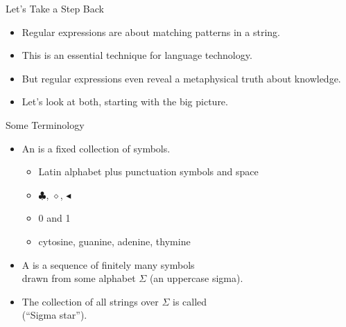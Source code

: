 \documentclass[professionalfonts, xcolor={usenames,svgnames,x11names,table}]{beamer}
\begin{document}
\begin{frame}{Let's Take a Step Back}
    \begin{itemize}
        \item Regular expressions are about matching patterns in a string.
        \item This is an essential technique for language technology.
        \item But regular expressions even reveal a metaphysical truth about knowledge.
        \item Let's look at both, starting with the big picture.
    \end{itemize}
\end{frame}

\begin{frame}{Some Terminology}
    \begin{itemize}
        \item An  is a fixed collection of symbols.
            \begin{example}
                \begin{itemize}
                    \item Latin alphabet plus punctuation symbols and space
                    \item $\clubsuit$, $\diamond$, $\blacktriangleleft$
                    \item 0 and 1
                    \item cytosine, guanine, adenine, thymine
                \end{itemize}
            \end{example}
        \item A  is a sequence of finitely many symbols\\
            drawn from some alphabet $\Sigma$ (an uppercase sigma).
        \item The collection of all strings over $\Sigma$ is called \highlight{$\mathbf{\Sigma^*}$}\\
            (``Sigma star'').
    \end{itemize}
\end{frame}
\end{document}
